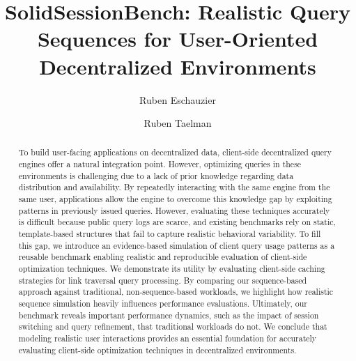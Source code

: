 \documentclass[runningheads]{llncs}
\begin{document}
%
\title{SolidSessionBench: Realistic Query Sequences for User-Oriented Decentralized Environments} 
\author{Ruben Eschauzier \and
Ruben Taelman}


%
%
%
\maketitle              %
%
\begin{abstract}

To build user-facing applications on decentralized data, 
client-side decentralized query engines offer a natural integration point.
However, optimizing queries in these environments is challenging 
due to a lack of prior knowledge regarding data distribution and availability.
By repeatedly interacting with the same engine from the same user, 
applications allow the engine to overcome this knowledge gap by exploiting patterns in previously issued queries.
However, evaluating these techniques accurately is difficult 
because public query logs are scarce, 
and existing benchmarks rely on static, template-based structures 
that fail to capture realistic behavioral variability.
To fill this gap, we introduce an evidence-based simulation 
of client query usage patterns as a reusable benchmark enabling 
realistic and reproducible evaluation of client-side optimization techniques.
We demonstrate its utility by evaluating client-side caching strategies 
for link traversal query processing.
By comparing our sequence-based approach against traditional, non-sequence-based workloads, 
we highlight how realistic sequence simulation heavily influences performance evaluations.
Ultimately, our benchmark reveals important performance dynamics, such as the impact 
of session switching and query refinement, that traditional workloads do not.
We conclude that modeling realistic user interactions provides an essential foundation 
for accurately evaluating client-side optimization techniques in decentralized environments.

\end{abstract}
\end{document}
